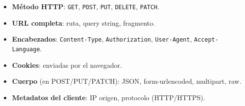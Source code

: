 \begin{itemize}
\item \textbf{Método HTTP}: \texttt{GET}, \texttt{POST}, \texttt{PUT},
\texttt{DELETE}, \texttt{PATCH}.
\item \textbf{URL completa}: ruta, query string, fragmento.
\item \textbf{Encabezados}: \texttt{Content-Type},
\texttt{Authorization}, \texttt{User-Agent}, \texttt{Accept-Language}.
\item \textbf{Cookies}: enviadas por el navegador.
\item \textbf{Cuerpo} (en POST/PUT/PATCH): JSON, form-urlencoded,
multipart, raw.
\item \textbf{Metadatos del cliente}: IP origen, protocolo (HTTP/HTTPS).
\end{itemize}

